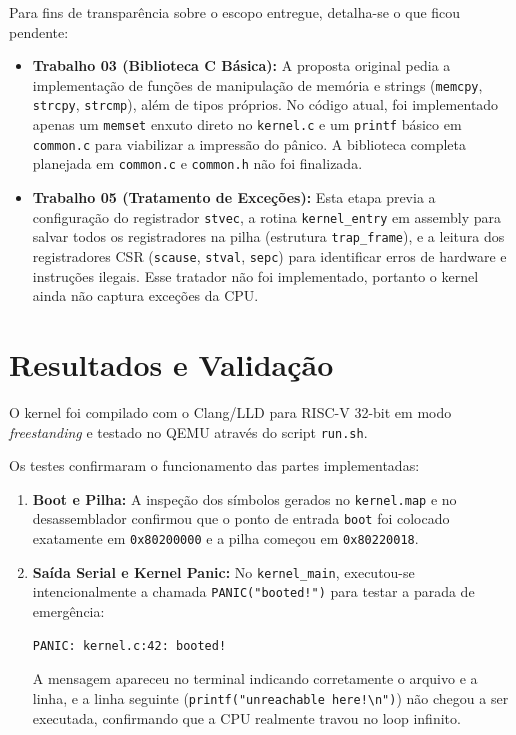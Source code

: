\documentclass[12pt]{article}
\begin{document}
Para fins de transparência sobre o escopo entregue, detalha-se o que ficou pendente:

\begin{itemize}
    \item \textbf{Trabalho 03 (Biblioteca C Básica):} A proposta original pedia a implementação de funções de manipulação de memória e strings (\texttt{memcpy}, \texttt{strcpy}, \texttt{strcmp}), além de tipos próprios. No código atual, foi implementado apenas um \texttt{memset} enxuto direto no \texttt{kernel.c} e um \texttt{printf} básico em \texttt{common.c} para viabilizar a impressão do pânico. A biblioteca completa planejada em \texttt{common.c} e \texttt{common.h} não foi finalizada.
    \item \textbf{Trabalho 05 (Tratamento de Exceções):} Esta etapa previa a configuração do registrador \texttt{stvec}, a rotina \texttt{kernel\_entry} em assembly para salvar todos os registradores na pilha (estrutura \texttt{trap\_frame}), e a leitura dos registradores CSR (\texttt{scause}, \texttt{stval}, \texttt{sepc}) para identificar erros de hardware e instruções ilegais. Esse tratador não foi implementado, portanto o kernel ainda não captura exceções da CPU.
\end{itemize}

\section{Resultados e Validação}

O kernel foi compilado com o Clang/LLD para RISC-V 32-bit em modo \textit{freestanding} e testado no QEMU através do script \texttt{run.sh}.

Os testes confirmaram o funcionamento das partes implementadas:
\begin{enumerate}
    \item \textbf{Boot e Pilha:} A inspeção dos símbolos gerados no \texttt{kernel.map} e no desassemblador confirmou que o ponto de entrada \texttt{boot} foi colocado exatamente em \texttt{0x80200000} e a pilha começou em \texttt{0x80220018}.
    \item \textbf{Saída Serial e Kernel Panic:} No \texttt{kernel\_main}, executou-se intencionalmente a chamada \texttt{PANIC("booted!")} para testar a parada de emergência:
\begin{verbatim}
PANIC: kernel.c:42: booted!
\end{verbatim}
    A mensagem apareceu no terminal indicando corretamente o arquivo e a linha, e a linha seguinte (\texttt{printf("unreachable here!\textbackslash n")}) não chegou a ser executada, confirmando que a CPU realmente travou no loop infinito.
\end{enumerate}
\end{document}
